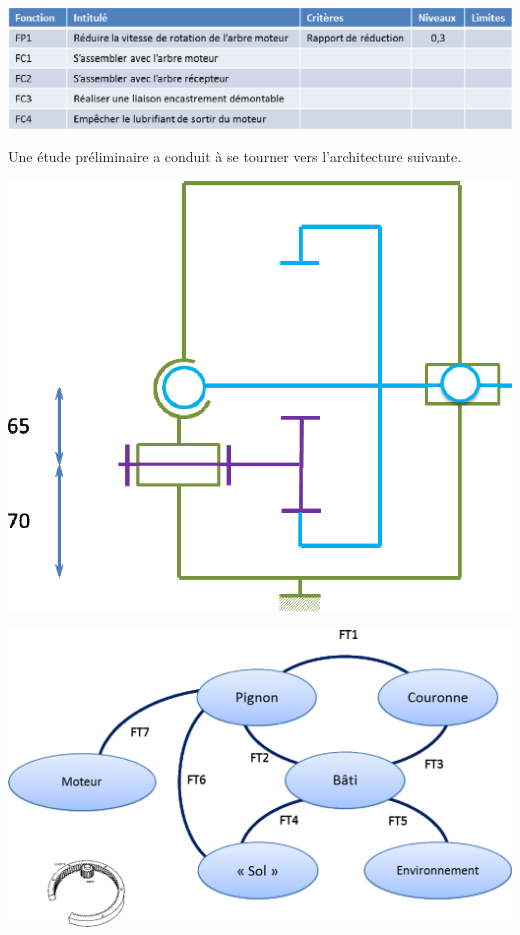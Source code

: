 \documentclass[11pt,oneside]{article}
\begin{document}
\begin{center}
\includegraphics[width=.9\textwidth]{png/img2}
\end{center}


Une étude préliminaire a conduit à se tourner vers l'architecture suivante. 

\vspace{.25cm}

\begin{minipage}[c]{.4\linewidth}
\begin{center}
\includegraphics[width=.8\textwidth]{png/img3}
\end{center}
\end{minipage}\hfill
\begin{minipage}[c]{.55\linewidth}
\begin{center}
\includegraphics[width=.95\textwidth]{png/img4}
\end{center}
\end{minipage}
\end{document}
